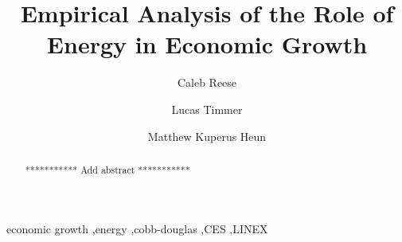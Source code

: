 \documentclass[preprint,authoryear,12pt]{elsarticle}\usepackage{graphicx, color}
\begin{document}
\begin{frontmatter}



\title{Empirical Analysis of the Role of Energy in Economic Growth}


\author[Calvin]{Caleb Reese}
\author[Calvin]{Lucas Timmer}
\author[Calvin]{Matthew Kuperus Heun }

\address[Calvin]{Engineering Department, Calvin College, Grand Rapids, MI 49546, USA}

\begin{abstract}
*********** Add abstract ***********
\end{abstract}

\begin{keyword}
economic growth \sep energy \sep cobb-douglas \sep CES \sep LINEX
\end{keyword}

\end{frontmatter}


\end{document}
